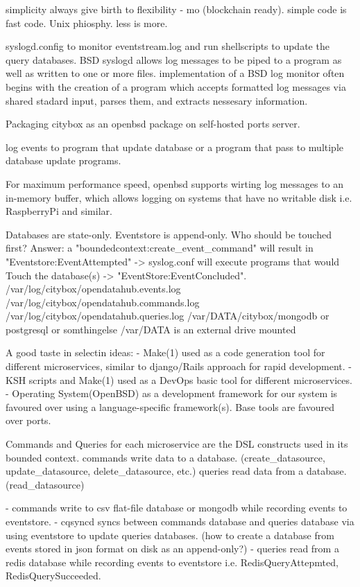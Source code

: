 simplicity always give birth to flexibility - mo (blockchain ready). simple code is fast code. Unix phiosphy. less is more.

syslogd.config to monitor eventstream.log and run shellscripts to update the query databases.
BSD syslogd allows log messages to be piped to a program as well as written to one or more files.
implementation of a BSD log monitor often begins with the creation of a program which accepts formatted log messages via
shared stadard input, parses them, and extracts nessesary information.

Packaging citybox as an openbsd package on self-hosted ports server.

log events to program that update database or a program that pass to multiple database update programs.

For maximum performance speed, openbsd supports wirting log messages to an in-memory buffer, 
which allows logging on systems that have no writable disk i.e. RaspberryPi and similar.


Databases are state-only. 
Eventstore is append-only. 
Who should be touched first?
Answer: a "boundedcontext:create_event_command" will result in 
"Eventstore:EventAttempted" -> syslog.conf will execute programs that would Touch the database(s) -> "EventStore:EventConcluded".
/var/log/citybox/opendatahub.events.log
/var/log/citybox/opendatahub.commands.log
/var/log/citybox/opendatahub.queries.log
/var/DATA/citybox/mongodb or postgresql or somthingelse
/var/DATA is an external drive mounted

A good taste in selectin ideas:
- Make(1) used as a code generation tool for different microservices, similar to django/Rails approach for rapid development. 
- KSH scripts and Make(1) used as a DevOps basic tool for different microservices.
- Operating System(OpenBSD) as a development framework for our system is favoured over using a language-specific framework(s). Base tools are favoured over ports. 

Commands and Queries for each microservice are the DSL constructs used in its bounded context.
commands write data to a database. (create_datasource, update_datasource, delete_datasource, etc.)
queries read data from a database. (read_datasource)

- commands write to csv flat-file database or mongodb while recording events to eventstore.
- cqsyncd syncs between commands database and queries database via using eventstore to update queries databases. (how to create a database from events stored in json format on disk as an append-only?)
- queries read from a redis database while recording events to eventstore i.e. RedisQueryAttepmted, RedisQuerySucceeded.

